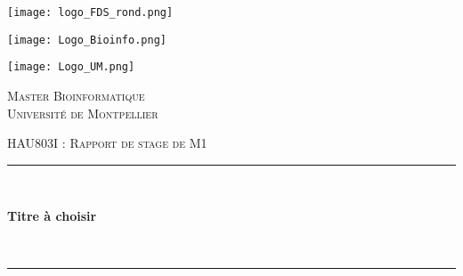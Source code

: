 \begin{titlepage}

\begin{minipage}{0.35\textwidth}
\vspace{15mm}
    \centering
    \texttt{[image: logo\_FDS\_rond.png]} %
\vspace{5mm}
\end{minipage}
\begin{minipage}{0.3\textwidth}
\vspace{15mm}
    \centering
    \texttt{[image: Logo\_Bioinfo.png]} %
    \vspace{5mm}
\end{minipage}
\begin{minipage}{0.3\textwidth}
    \vspace{15mm}
    \centering
    \texttt{[image: Logo\_UM.png]} %
    \vspace{5mm}
\end{minipage}
\vspace{5mm}


\centering %

{\scshape\LARGE Master Bioinformatique \\ Université de Montpellier\par} %
    \vspace{8mm}
{\scshape\Large HAU803I : Rapport de stage de M1  \par} %
\vspace{1cm}
\rule{\linewidth}{0.5 mm} \\[0.5 cm]
{\huge\bfseries Titre à choisir \par} \
\rule{\linewidth}{0.5 mm} \\[1.5 cm]


\end{titlepage}

